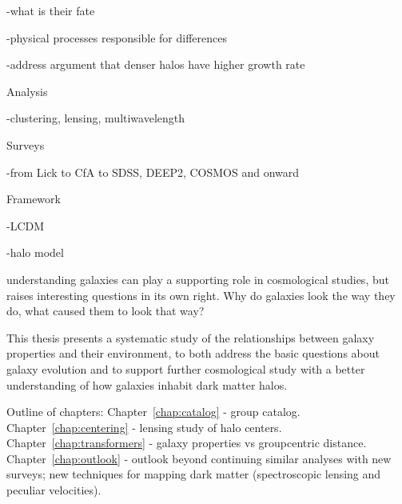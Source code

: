 -what is their fate

-physical processes responsible for differences

-address argument that denser halos have higher growth rate


Analysis

-clustering, lensing, multiwavelength


Surveys

-from Lick to CfA to SDSS, DEEP2, COSMOS and onward


Framework

-LCDM

-halo model


understanding galaxies can play a supporting role in cosmological
studies, but raises interesting questions in its own right. Why do
galaxies look the way they do, what caused them to look that way?

This thesis presents a systematic study of the relationships between
galaxy properties and their environment, to both address the basic
questions about galaxy evolution and to support further cosmological
study with a better understanding of how galaxies inhabit dark matter
halos.

Outline of chapters:
Chapter~\ref{chap:catalog} - group catalog.
Chapter~\ref{chap:centering} - lensing study of halo centers.
Chapter~\ref{chap:transformers} - galaxy properties vs groupcentric
distance.
Chapter~\ref{chap:outlook} - outlook beyond continuing similar
analyses with new surveys; new techniques for mapping dark matter
(spectroscopic lensing and peculiar velocities).
